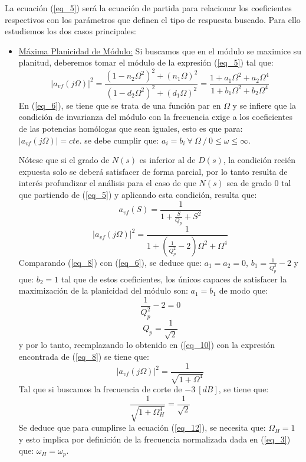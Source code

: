 \documentclass[12pt,a4paper]{article}
\begin{document}
La ecuación (\ref{eq_5}) será la ecuación de partida para relacionar los coeficientes respectivos con los parámetros que definen el tipo de respuesta buscado. Para ello estudiemos los dos casos principales:
\begin{itemize}
    \item \underline{Máxima Planicidad de Módulo:} Si buscamos que en el módulo se maximice su planitud, deberemos tomar el módulo de la expresión (\ref{eq_5}) tal que:
    \begin{equation}
        \label{eq_6}
        |a_{vf}(j\Omega)|^2 = \frac{(1 - n_2 \Omega^2)^2 + (n_1 \Omega)^2}{(1 - d_2 \Omega^2)^2 + (d_1 \Omega)^2} = \frac{1 + a_1\Omega^2 + a_2\Omega^4}{1 + b_1\Omega^2 + b_2\Omega^4}
    \end{equation}
    En (\ref{eq_6}), se tiene que se trata de una función par en $\Omega$ y se infiere que la condición de invarianza del módulo con la frecuencia exige a los coeficientes de las potencias homólogas que sean iguales, esto es que para: $|a_{vf}(j\Omega)|=cte.$ se debe cumplir que: $a_i = b_i \ \forall \ \Omega \ / \ 0 \leqslant \omega \leqslant \infty$.
    
    Nótese que si el grado de $N(s)$ es inferior al de $D(s)$, la condición recién expuesta solo se deberá satisfacer de forma parcial, por lo tanto resulta de interés profundizar el análisis para el caso de que $N(s)$ sea de grado 0 tal que partiendo de (\ref{eq_5}) y aplicando esta condición, resulta que:
    \begin{equation}
        \label{eq_7}
        a_{vf}(S) = \frac{1}{1 + \frac{S}{Q_p} + S^2}
    \end{equation}
    \begin{equation}
        \label{eq_8}
        |a_{vf}(j\Omega)|^2 = \frac{1}{1 + (\frac{1}{Q_p^2} - 2)\Omega^2 + \Omega^4}
    \end{equation}
    Comparando (\ref{eq_8}) con (\ref{eq_6}), se deduce que: $a_1=a_2=0$, $b_1=\frac{1}{Q_p^2}-2$ y que: $b_2=1$ tal que de estos coeficientes, los únicos capaces de satisfacer la maximización de la planicidad del módulo son: $a_1=b_1$ de modo que: 
    \begin{equation}
        \label{eq_9}
        \frac{1}{Q_p^2}-2=0
    \end{equation}
    \begin{equation}
        \label{eq_10}
        Q_p = \frac{1}{\sqrt{2}}
    \end{equation}
     y por lo tanto, reemplazando lo obtenido en (\ref{eq_10}) con la expresión encontrada de (\ref{eq_8}) se tiene que:
     \begin{equation}
         \label{eq_11}
         |a_{vf}(j\Omega)|^2 = \frac{1}{\sqrt{1 + \Omega^4}}
     \end{equation}
    Tal que si buscamos la frecuencia de corte de $-3 \ [dB]$, se tiene que:
    \begin{equation}
        \label{eq_12}
        \frac{1}{\sqrt{1 + \Omega_H^4}} = \frac{1}{\sqrt{2}}
    \end{equation}
    Se deduce que para cumplirse la ecuación (\ref{eq_12}), se necesita que: $\Omega_H = 1$ y esto implica por definición de la frecuencia normalizada dada en (\ref{eq_3}) que: $\omega_H = \omega_p$.


\end{itemize}
\end{document}
